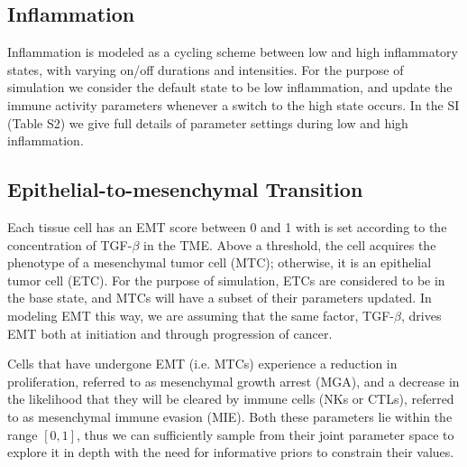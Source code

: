 \documentclass[11pt]{article}
\begin{document}
\subsection{Inflammation} 
Inflammation is modeled as a cycling scheme between low and high inflammatory states, with varying on/off durations and intensities.
For the purpose of simulation we consider the default state to be low inflammation, and update the immune activity parameters whenever a switch to the high state occurs.
In the SI (Table S2) we give full details of parameter settings during low and high inflammation.

\subsection{Epithelial-to-mesenchymal Transition}\label{EMT}
Each tissue cell has an EMT score between 0 and 1 with is set according to the concentration of TGF-$\beta$ in the TME. Above a threshold, the cell acquires the phenotype of a mesenchymal tumor cell (MTC); otherwise, it is an epithelial tumor cell (ETC).
For the purpose of simulation, ETCs are considered to be in the base state, and MTCs will have a subset of their parameters updated.
In modeling EMT this way, we are assuming that the same factor, TGF-$\beta$, drives EMT both at initiation and through progression of cancer.

\par
Cells that have undergone EMT (i.e. MTCs) experience a reduction in proliferation, referred to as mesenchymal growth arrest (MGA), and a decrease in the likelihood that they will be cleared by immune cells (NKs or CTLs), referred to as mesenchymal immune evasion (MIE). Both these parameters lie within the range $[0,1]$, thus we can sufficiently sample from their joint parameter space to explore it in depth with the need for informative priors to constrain their values.
\end{document}
